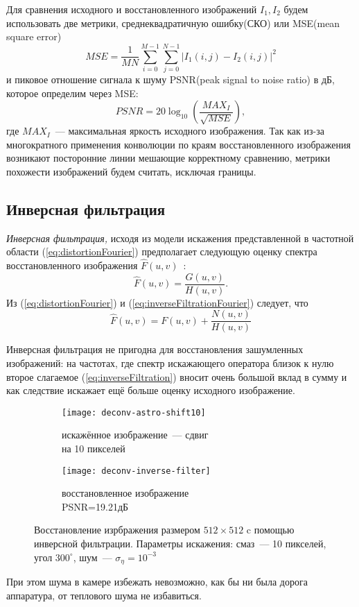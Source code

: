 Для сравнения исходного и восстановленного изображений $I_1, I_2$ будем использовать две метрики, среднеквадратичную ошибку(СКО) или MSE(mean square error)
\begin{equation}\label{eq:mse}
MSE = \frac{1}{MN}\sum_{i=0}^{M-1}\sum_{j=0}^{N-1}\left| I_1(i,j)-I_2(i,j)\right|^2
\end{equation}
и пиковое отношение сигнала к шуму PSNR(peak signal to noise ratio) в дБ, которое определим через MSE: 
\begin{equation}\label{eq:psnr}
PSNR = 20\log_{10}\left(\frac{MAX_I}{\sqrt{MSE}}\right),
\end{equation}
где $MAX_I$~--- максимальная яркость исходного изображения. Так как из-за многократного применения конволюции по краям восстановленного изображения возникают посторонние линии мешающие корректному сравнению, метрики похожести изображений будем считать, исключая границы.

\subsection{Инверсная фильтрация}
\textit{Инверсная фильтрация,} исходя из модели искажения представленной в частотной области (\ref{eq:distortionFourier}) предполагает следующую оценку спектра восстановленного изображения $\hat{F}(u,v)$~\cite[стр.~411]{gonsalesDigital2012}:
\begin{equation}\label{eq:inverseFiltrationFourier}
\hat{F}(u,v) = \frac{G(u,v)}{H(u,v)}.
\end{equation}
Из (\ref{eq:distortionFourier}) и (\ref{eq:inverseFiltrationFourier}) следует, что
\begin{equation}\label{eq:inverseFiltration}
\hat{F}(u,v) = F(u,v) + \frac{N(u,v)}{H(u,v)}
\end{equation}

Инверсная фильтрация не пригодна для восстановления зашумленных изображений: на частотах, где спектр искажающего оператора близок к нулю второе слагаемое (\ref{eq:inverseFiltration}) вносит очень большой вклад в сумму и как следствие искажает ещё больше оценку исходного изображение.
\begin{figure}[h!]
	\begin{subfigure}[b]{0.5\textwidth}
		\texttt{[image: deconv-astro-shift10]}
		\caption{искажённое изображение~--- сдвиг \\на 10 пикселей}
		\label{fig:astroShift10}
	\end{subfigure}%
	\begin{subfigure}[b]{0.5\textwidth}
		\texttt{[image: deconv-inverse-filter]}
		\caption{восстановленное изображение\\ PSNR=19.21дБ}
		\label{fig:astroInverseRestored}
	\end{subfigure}%
	\caption{Восстановление изрбражения размером $512\times 512$ c помощью инверсной фильтрации. Параметры искажения: смаз~--- 10 пикселей, угол $300^\circ$, шум~--- $\sigma_\eta=10^{-3}$}
\end{figure}
При этом шума в камере избежать невозможно, как бы ни была дорога аппаратура, от теплового шума не избавиться.

